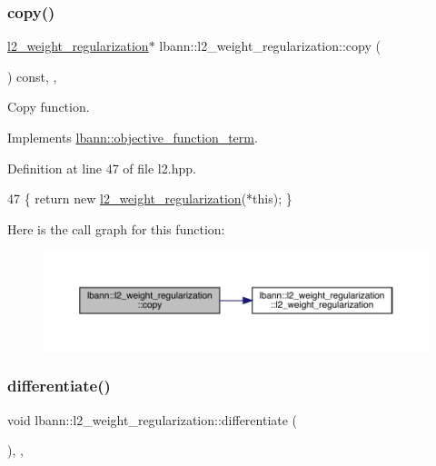 \subsubsection{\texorpdfstring{copy()}{copy()}}
{\footnotesize\ttfamily \hyperlink{classlbann_1_1l2__weight__regularization}{l2\+\_\+weight\+\_\+regularization}$\ast$ lbann\+::l2\+\_\+weight\+\_\+regularization\+::copy (\begin{DoxyParamCaption}{ }\end{DoxyParamCaption}) const\hspace{0.3cm}{\ttfamily [inline]}, {\ttfamily [override]}, {\ttfamily [virtual]}}

Copy function. 

Implements \hyperlink{classlbann_1_1objective__function__term_ae98a4ec173a602ad55d1df20dadd4cb9}{lbann\+::objective\+\_\+function\+\_\+term}.



Definition at line 47 of file l2.\+hpp.


\begin{DoxyCode}
47 \{ \textcolor{keywordflow}{return} \textcolor{keyword}{new} \hyperlink{classlbann_1_1l2__weight__regularization_aa2a01507574b4d349ae8bb9bb784ecaf}{l2\_weight\_regularization}(*\textcolor{keyword}{this}); \}
\end{DoxyCode}
Here is the call graph for this function\+:\nopagebreak
\begin{figure}[H]
\begin{center}
\leavevmode
\includegraphics[width=350pt]{classlbann_1_1l2__weight__regularization_ac00a969efe6c3fd911a0d69428bb5b95_cgraph}
\end{center}
\end{figure}
\mbox{\label{classlbann_1_1l2__weight__regularization_a64f5cd1a4a30727a81f112e51367700e}} 
\subsubsection{\texorpdfstring{differentiate()}{differentiate()}}
{\footnotesize\ttfamily void lbann\+::l2\+\_\+weight\+\_\+regularization\+::differentiate (\begin{DoxyParamCaption}{ }\end{DoxyParamCaption})\hspace{0.3cm}{\ttfamily [inline]}, {\ttfamily [override]}, {\ttfamily [virtual]}}

